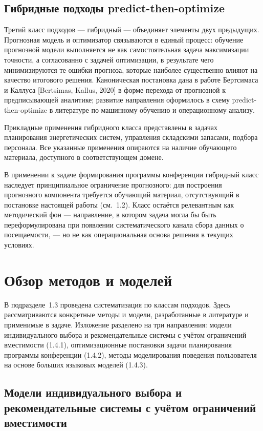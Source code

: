 \subsection{Гибридные подходы predict-then-optimize}

Третий класс подходов --- гибридный --- объединяет элементы двух предыдущих. Прогнозная модель и оптимизатор связываются в единый процесс: обучение прогнозной модели выполняется не как самостоятельная задача максимизации точности, а согласованно с задачей оптимизации, в результате чего минимизируются те ошибки прогноза, которые наиболее существенно влияют на качество итогового решения. Каноническая постановка дана в работе Бертсимаса и Каллуса [Bertsimas, Kallus, 2020] в форме перехода от прогнозной к предписывающей аналитике; развитие направления оформилось в схему predict-then-optimize в литературе по машинному обучению и операционному анализу.

Прикладные применения гибридного класса представлены в задачах планирования энергетических систем, управления складскими запасами, подбора персонала. Все указанные применения опираются на наличие обучающего материала, доступного в соответствующем домене.

В применении к задаче формирования программы конференции гибридный класс наследует принципиальное ограничение прогнозного: для построения прогнозного компонента требуется обучающий материал, отсутствующий в постановке настоящей работы (см.~1.2). Класс остаётся релевантным как методический фон --- направление, в котором задача могла бы быть переформулирована при появлении систематического канала сбора данных о посещаемости, --- но не как операциональная основа решения в текущих условиях.


\section{Обзор методов и моделей}

В подразделе~1.3 проведена систематизация по классам подходов. Здесь рассматриваются конкретные методы и модели, разработанные в литературе и применимые в задаче. Изложение разделено на три направления: модели индивидуального выбора и рекомендательные системы с учётом ограничений вместимости (1.4.1), оптимизационные постановки задачи планирования программы конференции (1.4.2), методы моделирования поведения пользователя на основе больших языковых моделей (1.4.3).


\subsection{Модели индивидуального выбора и рекомендательные системы с учётом ограничений вместимости}

